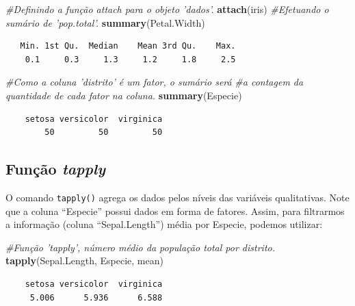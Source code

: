 \documentclass[12pt,brazil,oneside]{book}
\newenvironment{Shaded}{\begin{snugshade}}{\end{snugshade}}
\newcommand{\CommentTok}[1]{\textcolor[rgb]{0.56,0.35,0.01}{\textit{#1}}}
\newcommand{\KeywordTok}[1]{\textcolor[rgb]{0.13,0.29,0.53}{\textbf{#1}}}
\newcommand{\NormalTok}[1]{#1}
\begin{document}
\begin{Shaded}
\begin{Highlighting}[]
\CommentTok{#Definindo a função attach para o objeto 'dados'.}
\KeywordTok{attach}\NormalTok{(iris)}
\CommentTok{#Efetuando o sumário de 'pop.total'.}
\KeywordTok{summary}\NormalTok{(Petal.Width)}
\end{Highlighting}
\end{Shaded}

\begin{verbatim}
   Min. 1st Qu.  Median    Mean 3rd Qu.    Max. 
    0.1     0.3     1.3     1.2     1.8     2.5 
\end{verbatim}

\begin{Shaded}
\begin{Highlighting}[]
\CommentTok{#Como a coluna 'distrito' é um fator, o sumário será }
\CommentTok{#a contagem da quantidade de cada fator na coluna.}
\KeywordTok{summary}\NormalTok{(Especie)}
\end{Highlighting}
\end{Shaded}

\begin{verbatim}
    setosa versicolor  virginica 
        50         50         50 
\end{verbatim}

\hypertarget{funcao-tapply}{%
\subsection{\texorpdfstring{Função \emph{tapply}}{Função tapply}}\label{funcao-tapply}}

O comando \texttt{tapply()} agrega os dados pelos níveis das variáveis qualitativas. Note que a coluna ``Especie'' possui dados em forma de fatores. Assim, para filtrarmos a informação (coluna ``Sepal.Length'') média por Especie, podemos utilizar:

\begin{Shaded}
\begin{Highlighting}[]
\CommentTok{#Função 'tapply', número médio da população total por distrito.}
\KeywordTok{tapply}\NormalTok{(Sepal.Length, Especie, mean)}
\end{Highlighting}
\end{Shaded}

\begin{verbatim}
    setosa versicolor  virginica 
     5.006      5.936      6.588 
\end{verbatim}
\end{document}
